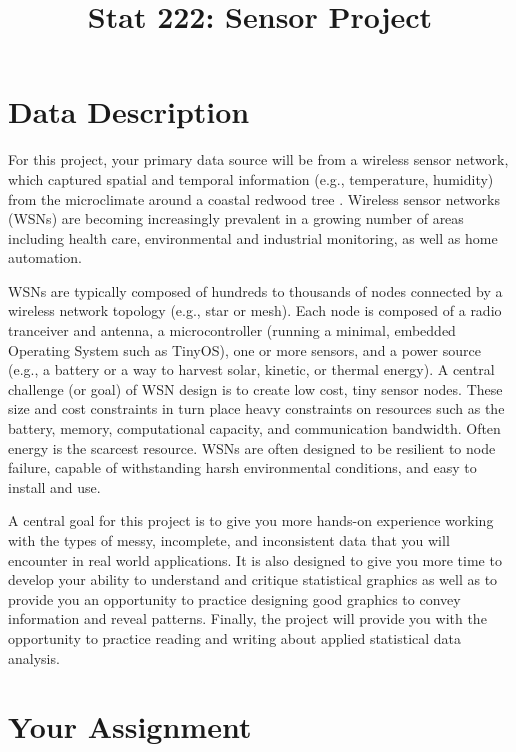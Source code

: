 \documentclass[11pt, oneside]{article}   	%
\title{Stat 222: Sensor Project}
\date{}							%
\begin{document}
\maketitle

\section{Data Description}

For this project, your primary data source will be from a wireless sensor
network, which captured spatial and temporal information (e.g., temperature,
humidity) from the microclimate around a coastal redwood tree
\cite{tolle2005macroscope, yang2003redwoods}.  Wireless sensor networks (WSNs)
are becoming increasingly prevalent in a growing number of areas including
health care, environmental and industrial monitoring, as well as home
automation.

WSNs are typically composed of hundreds to thousands of nodes connected by a
wireless network topology (e.g., star or mesh).  Each node is composed of a
radio tranceiver and antenna, a microcontroller (running a minimal, embedded
Operating System such as TinyOS), one or more sensors, and a power source
(e.g., a battery or a way to harvest solar, kinetic, or thermal energy).  A
central challenge (or goal) of WSN design is to create low cost, tiny sensor
nodes.  These size and cost constraints in turn place heavy constraints on
resources such as the battery, memory, computational capacity, and
communication bandwidth.  Often energy is the scarcest resource.  WSNs are
often designed to be resilient to node failure, capable of withstanding harsh
environmental conditions, and easy to install and use. 

A central goal for this project is to give you more hands-on experience working
with the types of messy, incomplete, and inconsistent data that you will
encounter in real world applications.  It is also designed to give you more
time to develop your ability to understand and critique statistical graphics as
well as to provide you an opportunity to practice designing good graphics to
convey information and reveal patterns.  Finally, the project will provide you
with the opportunity to practice reading and writing about applied statistical
data analysis.


\section{Your Assignment}
\end{document}
